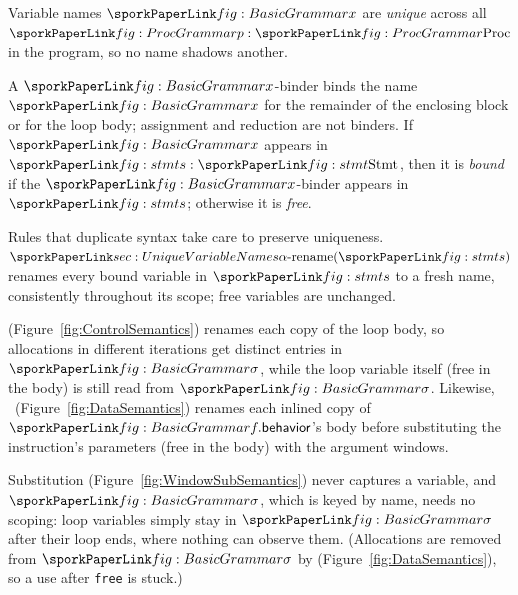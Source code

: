 
Variable names $\sporkx$ are \emph{unique} across all $\sporkp:\sporkProc$ in the program, so no name shadows another.

A $\sporkx$-binder binds the name $\sporkx$ for the remainder of the enclosing block or for the loop body;
assignment and reduction are not binders.
If $\sporkx$ appears in $\sporks: \sporkStmt$, then it is \emph{bound} if the $\sporkx$-binder appears in $\sporks$;
otherwise it is \emph{free}.

Rules that duplicate syntax take care to preserve uniqueness.
$\sporkalphaRename(\sporks)$ renames every bound variable in $\sporks$ to a fresh name,
consistently throughout its scope;
free variables are unchanged.

\sporkCForIter{} (Figure~\ref{fig:ControlSemantics}) renames each copy of the loop body,
so allocations in different iterations get distinct entries in $\sporksigma$,
while the loop variable itself (free in the body) is still read from $\sporksigma$.
Likewise, \sporkDInstrSub\ (Figure~\ref{fig:DataSemantics}) renames each inlined copy of $\sporkfBehavior$'s body
before substituting the instruction's parameters (free in the body) with the argument windows.

Substitution (Figure~\ref{fig:WindowSubSemantics}) never captures a variable,
and $\sporksigma$, which is keyed by name, needs no scoping:
loop variables simply stay in $\sporksigma$ after their loop ends, where nothing can observe them.
(Allocations are removed from $\sporksigma$ by \sporkDFree{} (Figure~\ref{fig:DataSemantics}), so a use after \texttt{free} is stuck.)
